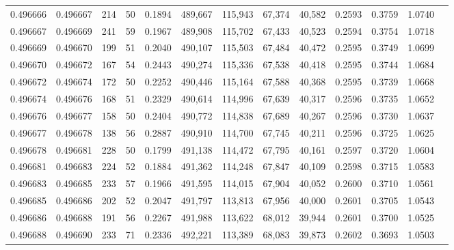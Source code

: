 \begin{tabular}{rrrrrrrrrrrrr}
0.496666 & 0.496667 &   214 &  50 &                                     0.1894 & 489,667 & 115,943 &  67,374 &  40,582 & 0.2593 & 0.3759 & 1.0740 \\
0.496667 & 0.496669 &   241 &  59 &                                     0.1967 & 489,908 & 115,702 &  67,433 &  40,523 & 0.2594 & 0.3754 & 1.0718 \\
0.496669 & 0.496670 &   199 &  51 &                                     0.2040 & 490,107 & 115,503 &  67,484 &  40,472 & 0.2595 & 0.3749 & 1.0699 \\
0.496670 & 0.496672 &   167 &  54 &                                     0.2443 & 490,274 & 115,336 &  67,538 &  40,418 & 0.2595 & 0.3744 & 1.0684 \\
0.496672 & 0.496674 &   172 &  50 &                                     0.2252 & 490,446 & 115,164 &  67,588 &  40,368 & 0.2595 & 0.3739 & 1.0668 \\
0.496674 & 0.496676 &   168 &  51 &                                     0.2329 & 490,614 & 114,996 &  67,639 &  40,317 & 0.2596 & 0.3735 & 1.0652 \\
0.496676 & 0.496677 &   158 &  50 &                                     0.2404 & 490,772 & 114,838 &  67,689 &  40,267 & 0.2596 & 0.3730 & 1.0637 \\
0.496677 & 0.496678 &   138 &  56 &                                     0.2887 & 490,910 & 114,700 &  67,745 &  40,211 & 0.2596 & 0.3725 & 1.0625 \\
0.496678 & 0.496681 &   228 &  50 &                                     0.1799 & 491,138 & 114,472 &  67,795 &  40,161 & 0.2597 & 0.3720 & 1.0604 \\
0.496681 & 0.496683 &   224 &  52 &                                     0.1884 & 491,362 & 114,248 &  67,847 &  40,109 & 0.2598 & 0.3715 & 1.0583 \\
0.496683 & 0.496685 &   233 &  57 &                                     0.1966 & 491,595 & 114,015 &  67,904 &  40,052 & 0.2600 & 0.3710 & 1.0561 \\
0.496685 & 0.496686 &   202 &  52 &                                     0.2047 & 491,797 & 113,813 &  67,956 &  40,000 & 0.2601 & 0.3705 & 1.0543 \\
0.496686 & 0.496688 &   191 &  56 &                                     0.2267 & 491,988 & 113,622 &  68,012 &  39,944 & 0.2601 & 0.3700 & 1.0525 \\
0.496688 & 0.496690 &   233 &  71 &                                     0.2336 & 492,221 & 113,389 &  68,083 &  39,873 & 0.2602 & 0.3693 & 1.0503 \\

\end{tabular}

